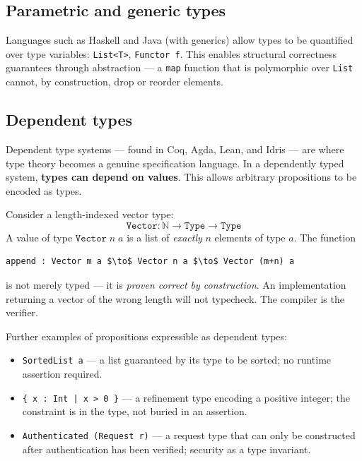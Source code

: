 \documentclass[12pt]{article}
\begin{document}
\subsection{Parametric and generic types}

Languages such as Haskell and Java (with generics) allow types to be
quantified over type variables: \texttt{List<T>}, \texttt{Functor f}. This
enables structural correctness guarantees through abstraction --- a
\texttt{map} function that is polymorphic over \texttt{List} cannot, by
construction, drop or reorder elements.

\subsection{Dependent types}

Dependent type systems --- found in Coq, Agda, Lean, and Idris --- are where
type theory becomes a genuine specification language. In a dependently typed
system, \textbf{types can depend on values}. This allows arbitrary
propositions to be encoded as types.

Consider a length-indexed vector type:
\[
  \texttt{Vector} : \mathbb{N} \to \texttt{Type} \to \texttt{Type}
\]
A value of type $\texttt{Vector}\; n\; a$ is a list of \emph{exactly} $n$
elements of type $a$. The function

\begin{lstlisting}[mathescape=true]
append : Vector m a $\to$ Vector n a $\to$ Vector (m+n) a
\end{lstlisting}

is not merely typed --- it is \emph{proven correct by construction}. An
implementation returning a vector of the wrong length will not typecheck. The
compiler is the verifier.

Further examples of propositions expressible as dependent types:

\begin{itemize}
  \item \texttt{SortedList a} --- a list guaranteed by its type to be sorted;
        no runtime assertion required.
  \item \texttt{\{ x : Int | x > 0 \}} --- a refinement type encoding a
        positive integer; the constraint is in the type, not buried in an
        assertion.
  \item \texttt{Authenticated (Request r)} --- a request type that can only
        be constructed after authentication has been verified; security as a
        type invariant.
\end{itemize}
\end{document}
